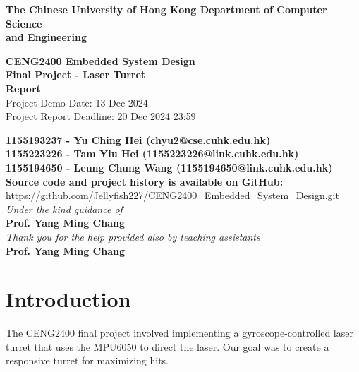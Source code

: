 \documentclass[12pt, a4paper]{article}
\begin{document}
\begin{titlepage}
    \begin{center}

		\bf\LARGE{The Chinese University of Hong Kong}
        \bf\Large{Department of Computer Science\\and Engineering}
		
		\vspace{80pt}
		
		\vspace{15pt}
		\textbf{\Large CENG2400 Embedded System Design\\}
		\vspace{6pt}
		\textbf{\Large Final Project - Laser Turret}\\
		\vspace{6pt}
		\textbf{\Large Report}\\
        \vspace{6pt}
        {\large Project Demo Date: 13 Dec 2024}\\
        {\large Project Report Deadline: 20 Dec 2024 23:59}
		\vspace{40pt}
		
        \vspace{15pt}
		\textbf{\normalsize
            1155193237 - Yu Ching Hei (chyu2@cse.cuhk.edu.hk)\\
			1155223226 - Tam Yiu Hei (1155223226@link.cuhk.edu.hk)\\
			1155194650 - Leung Chung Wang (1155194650@link.cuhk.edu.hk)\\}
		\vspace{40pt}
        \textbf{\large Source code and project history is available on GitHub:}\\
        \normalsize \url{https://github.com/Jellyfish227/CENG2400_Embedded_System_Design.git}\\
        \vspace{60pt}
		\textit{Under the kind guidance of}\\
		\textbf{\large Prof. Yang Ming Chang}\\
		\vspace{20pt}
        \textit{Thank you for the help provided also by teaching assistants}\\
		\textbf{\large Prof. Yang Ming Chang}
		
	\end{center}
\end{titlepage}
\setcounter{page}{2}
\tableofcontents
\section{Introduction}
The CENG2400 final project involved implementing a gyroscope-controlled laser turret 
that uses the MPU6050 to direct the laser. Our goal was to create a responsive turret for maximizing hits.
\end{document}
